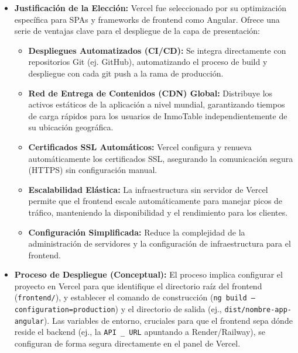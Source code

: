 \begin{itemize}
    \item \textbf{Justificación de la Elección:} Vercel fue seleccionado por su optimización específica para SPAs y frameworks de frontend como Angular. Ofrece una serie de ventajas clave para el despliegue de la capa de presentación:

    \begin{itemize}
        \item \textbf{Despliegues Automatizados (CI/CD):} Se integra directamente con repositorios Git (ej. GitHub), automatizando el proceso de build y despliegue con cada git push a la rama de producción.

        \item \textbf{Red de Entrega de Contenidos (CDN) Global:} Distribuye los activos estáticos de la aplicación a nivel mundial, garantizando tiempos de carga rápidos para los usuarios de InmoTable independientemente de su ubicación geográfica.

        \item \textbf{Certificados SSL Automáticos:} Vercel configura y renueva automáticamente los certificados SSL, asegurando la comunicación segura (HTTPS) sin configuración manual.

        \item \textbf{Escalabilidad Elástica:} La infraestructura sin servidor de Vercel permite que el frontend escale automáticamente para manejar picos de tráfico, manteniendo la disponibilidad y el rendimiento para los clientes.

        \item \textbf{Configuración Simplificada:} Reduce la complejidad de la administración de servidores y la configuración de infraestructura para el frontend.
    \end{itemize}

    \item \textbf{Proceso de Despliegue (Conceptual):} El proceso implica configurar el proyecto en Vercel para que identifique el directorio raíz del frontend (\texttt{frontend/}), y establecer el comando de construcción (\texttt{ng build --configuration=production}) y el directorio de salida (ej., \texttt{dist/nombre-app-angular}). Las variables de entorno, cruciales para que el frontend sepa dónde reside el backend (ej., la \texttt{API \_ URL} apuntando a Render/Railway), se configuran de forma segura directamente en el panel de Vercel.
\end{itemize}


